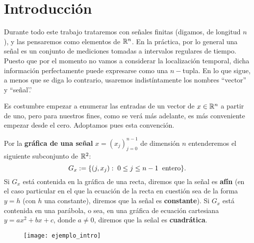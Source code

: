 \chapter{Introducción}
\label{chapter: introduccion}
Durante todo este trabajo trataremos con señales
finitas
(digamos, de
longitud $n$), y las pensaremos como elementos de $\mathbb{R}^{n}$.
En la práctica, por lo general
una señal es un conjunto de mediciones tomadas
a intervalos regulares de tiempo.
Puesto que por el momento no vamos
a considerar la localización temporal, dicha
información perfectamente puede expresarse como 
una $n-$tupla. En lo que sigue, a menos que se diga
lo contrario, usaremos indistíntamente los nombres
``vector'' y ``señal'.'

Es costumbre empezar
a enumerar las entradas de un vector
de $x \in \mathbb{R}^{n}$ a partir de uno, pero
para nuestros fines,
como se verá más adelante, es más 
conveniente empezar desde el cero.
Adoptamos pues esta convención.


\begin{defi}
\label{def: grafica senial}
Por la \textbf{gráfica de una señal} $x=(x_{j})_{j=0}^{n-1}$
de dimensión $n$ entenderemos
 el siguiente subconjunto de $\mathbb{R}^{2}$:
\[
G_{x} := 
\{ (j, x_{j} ) : \hspace{0.1cm} 0 \leq j \leq n-1
\hspace{0.2cm} \text{entero}\} .
\]
Si $G_{x}$ está contenida en la gráfica de una recta, diremos que la
señal es \textbf{afín}
(en el caso particular en el que
la ecuación de la recta en cuestión sea de la forma $y= h$
(con $h$ una constante),
diremos que la señal es
\textbf{constante}). Si  $G_{x}$ está contenida en 
una parábola, o sea, en una
gráfica de ecuación cartesiana
$y=ax^{2}+ bx +c$, donde $a \neq 0$, diremos 
que la señal es \textbf{cuadrática}.
\end{defi}


\begin{figure}[H]
	\texttt{[image: ejemplo\_intro]} 
 \end{figure}

